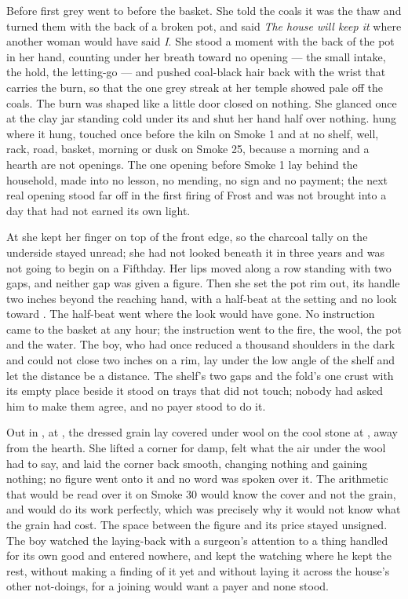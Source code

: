 Before first grey  went to  before the basket. She told the coals it was the thaw and turned them with the back of a broken pot, and said \emph{The house will keep it} where another woman would have said \emph{I}. She stood a moment with the back of the pot in her hand, counting under her breath toward no opening --- the small intake, the hold, the letting-go --- and pushed coal-black hair back with the wrist that carries the burn, so that the one grey streak at her temple showed pale off the coals. The burn was shaped like a little door closed on nothing. She glanced once at the clay jar standing cold under its  and shut her hand half over nothing.  hung where it hung, touched once before the kiln on Smoke 1 and at no shelf, well, rack, road, basket, morning or dusk on Smoke 25, because a morning and a hearth are not openings. The one opening before Smoke 1 lay behind the household, made into no lesson, no mending, no sign and no payment; the next real opening stood far off in the first firing of Frost and was not brought into a day that had not earned its own light.

At  she kept her finger on top of the front edge, so the charcoal tally on the underside stayed unread; she had not looked beneath it in three years and was not going to begin on a Fifthday. Her lips moved along a row standing with two gaps, and neither gap was given a figure. Then she set the pot rim out, its handle two inches beyond the reaching hand, with a half-beat at the setting and no look toward . The half-beat went where the look would have gone. No instruction came to the basket at any hour; the instruction went to the fire, the wool, the pot and the water. The boy, who had once reduced a thousand shoulders in the dark and could not close two inches on a rim, lay under the low angle of the shelf and let the distance be a distance. The shelf's two gaps and the fold's one crust with its empty place beside it stood on trays that did not touch; nobody had asked him to make them agree, and no payer stood to do it.

Out in , at , the dressed grain lay covered under wool on the cool stone at , away from the hearth. She lifted a corner for damp, felt what the air under the wool had to say, and laid the corner back smooth, changing nothing and gaining nothing; no figure went onto it and no word was spoken over it. The arithmetic that would be read over it on Smoke 30 would know the cover and not the grain, and would do its work perfectly, which was precisely why it would not know what the grain had cost. The space between the figure and its price stayed unsigned. The boy watched the laying-back with a surgeon's attention to a thing handled for its own good and entered nowhere, and kept the watching where he kept the rest, without making a finding of it yet and without laying it across the house's other not-doings, for a joining would want a payer and none stood.

